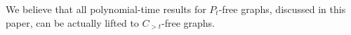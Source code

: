 \documentclass[11pt,a4paper]{article}
\theoremstyle{definition}
\begin{document}
We believe that all polynomial-time results for $P_t$-free graphs, discussed in this paper, can be actually lifted to $C_{>t}$-free graphs.





\end{document}
